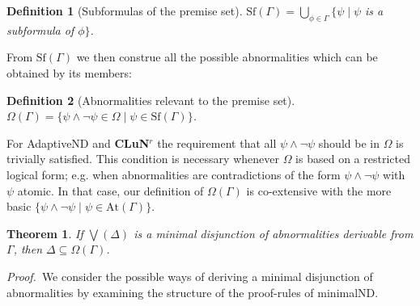 \documentclass[]{article}
\newtheorem{definition}{Definition}
\newtheorem{theorem}{Theorem}
\newcommand{\Turn}[2]
    { {#1}\vdash_{\textbf{\sf s}}  {#2}}
\newcommand{\TurnPrime}[2]
    { {#1}\vdash_{\textbf{\sf s'}}  {#2}}
\newcommand{\Sf}{\ensuremath{\mathrm{Sf}}}
\newcommand{\At}{\ensuremath{\mathrm{At}}}
\begin{document}


\begin{definition}[Subformulas of the premise set]
$\Sf(\Gamma)=\bigcup_{\phi \in \Gamma} \{\psi \mid \psi$ is a subformula of $ \phi\}$.
\end{definition}


From $\Sf(\Gamma)$ we then construe all the possible abnormalities which can be obtained by its members:

\begin{definition}[Abnormalities relevant to the premise set]
$\Omega(\Gamma)=\{\psi\wedge \neg \psi \in \Omega \mid \psi\in \Sf(\Gamma)\}$.
\end{definition}
For \textsf{AdaptiveND} and \textbf{CLuN$^r$} the requirement that all $\psi\wedge \neg \psi$ should be in $\Omega$ is trivially satisfied. This condition is necessary whenever $\Omega$ is based on a restricted logical form; e.g. when abnormalities are contradictions of the form $\psi \wedge \neg \psi$ with $\psi$ atomic. In that case, our definition of $\Omega(\Gamma)$ is co-extensive with the more basic $\{\psi \wedge \neg \psi \mid \psi \in \At(\Gamma)\}$.
%
%
\begin{theorem}\label{thm:subform}
    If $\bigvee(\Delta)$ is a minimal disjunction of abnormalities derivable from $\Gamma$, then $\Delta \subseteq \Omega(\Gamma)$.
\end{theorem}
\noindent\textsl{Proof.}~We consider the possible ways of deriving a minimal disjunction of abnormalities by examining the structure of the proof-rules of \textsf{minimalND}.
\end{document}
